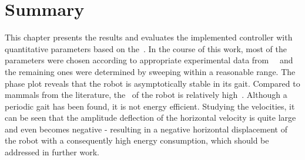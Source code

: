 %

\section{Summary}

This chapter presents the results and evaluates the implemented controller with quantitative parameters based on the~. In the course of this work, most of the parameters were chosen according to appropriate experimental data from~\citeauthor*{Geng2006}~\cite{Geng2006} and the remaining ones were determined by sweeping within a reasonable range. The phase plot reveals that the robot is asymptotically stable in its gait. Compared to mammals from the literature, the~ of the robot is relatively high~\cite{Lee2013}. Although a periodic gait has been found, it is not energy efficient. Studying the velocities, it can be seen that the amplitude deflection of the horizontal velocity is quite large and even becomes negative - resulting in a negative horizontal displacement of the robot with a consequently high energy consumption, which should be addressed in further work.